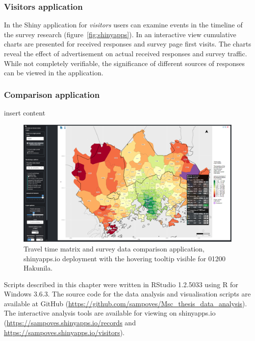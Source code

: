 \subsubsection{Visitors application}

In the Shiny application for \textit{visitors} users can examine events in the timeline of the survey research (figure~\ref{fig:shinyapps}). In an interactive view cumulative charts are presented for received responses and survey page first visits. The charts reveal the effect of advertisement on actual received responses and survey traffic. While not completely verifiable, the significance of different sources of responses can be viewed in the application.

\subsubsection{Comparison application}

insert content

\begin{figure}[H]%
    \includegraphics[width=\textwidth]{images/shinyapps_comparison.png}
    \caption[Comparison application screenshot]{Travel time matrix and survey data comparison application, shinyapps.io deployment with the hovering tooltip visible for 01200 Hakunila.}%
    \label{fig:shinyapps_comparison}%
\end{figure}

Scripts described in this chapter were written in RStudio 1.2.5033 using R for Windows 3.6.3. The source code for the data analysis and visualisation scripts are available at GitHub (\textcolor{blue}{\url{https://github.com/sampoves/Msc_thesis_data_analysis}}). The interactive analysis tools are available for viewing on shinyapps.io (\textcolor{blue}{\url{https://sampoves.shinyapps.io/records}} and  \textcolor{blue}{\url{https://sampoves.shinyapps.io/visitors}}).